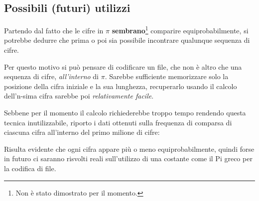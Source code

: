 
\subsection{Possibili (futuri) utilizzi}
Partendo dal fatto che le cifre in $\pi$ \textbf{sembrano}\footnote{Non è stato dimostrato per il momento.} comparire equiprobabilmente, si potrebbe dedurre che prima o poi sia possibile incontrare qualunque sequenza di cifre.

Per questo motivo si può pensare di codificare un file, che non è altro che una sequenza di cifre, \textit{all'interno} di $\pi$.
Sarebbe sufficiente memorizzare solo la posizione della cifra iniziale e la sua lunghezza, recuperarlo usando il calcolo dell'n-sima cifra sarebbe poi \textit{relativamente facile}.

\noindent Sebbene per il momento il calcolo richiederebbe troppo tempo rendendo questa tecnica inutilizzabile, riporto i dati ottenuti sulla frequenza di comparsa di ciascuna cifra all'interno del primo milione di cifre:
\newline \newline
{}

Risulta evidente che ogni cifra appare più o meno equiprobabilmente, quindi forse in futuro ci saranno risvolti reali sull'utilizzo di una costante come il Pi greco per la codifica di file.